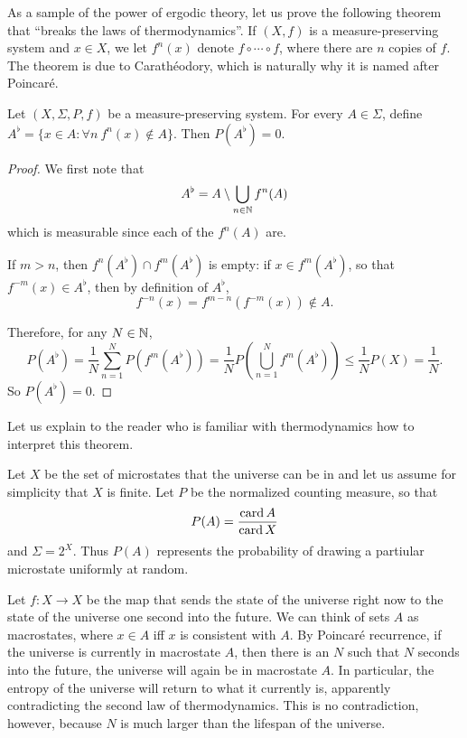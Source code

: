 \begin{subsec}
As a sample of the power of ergodic theory, let us prove the following theorem that ``breaks the laws of thermodynamics''.
If $(X, f)$ is a measure-preserving system and $x \in X$, we let $f^{n}(x)$ denote $f \circ \cdots \circ f$, where there are $n$ copies of $f$.
The theorem is due to Carathéodory, which is naturally why it is named after Poincar\'e.
\end{subsec}

\begin{theorem}
Let $(X, \Sigma, P, f)$ be a measure-preserving system.
For every $A \in \Sigma$, define $A^{\flat} = \{x \in A: \forall n~f^{n}(x) \notin A\}$.
Then $P(A^{\flat}) = 0$.
\end{theorem}
\begin{proof}
We first note that
\[A^{\flat} = A \setminus \bigcup_{n \in \mathbb{N}} f^{n}(A)\]
which is measurable since each of the $f^{n}(A)$ are.

If $m > n$, then $f^{n}(A^{\flat}) \cap f^{m}(A^{\flat})$ is empty: if $x \in f^{m}(A^{\flat})$, so that $f^{-m}(x) \in A^{\flat}$, then by definition of $A^{\flat}$,
\[f^{-n}(x) = f^{m-n}(f^{-m}(x)) \notin A.\]

Therefore, for any $N \in \mathbb{N}$,
\[P(A^{\flat}) = \frac{1}{N} \sum_{n=1}^{N} P(f^{m}(A^{\flat})) = \frac{1}{N} P\left(\bigcup_{n=1}^{N} f^{m}(A^{\flat})\right) \leq \frac{1}{N} P(X) = \frac{1}{N}.\]
So $P(A^{\flat}) = 0$.
\end{proof}

\begin{subsec}
Let us explain to the reader who is familiar with thermodynamics how to interpret this theorem.

Let $X$ be the set of microstates that the universe can be in and let us assume for simplicity that $X$ is finite.
Let $P$ be the normalized counting measure, so that
\[P(A) = \frac{\operatorname{card} A}{\operatorname{card} X}\]
and $\Sigma = 2^{X}$.
Thus $P(A)$ represents the probability of drawing a partiular microstate uniformly at random.

Let $f: X \to X$ be the map that sends the state of the universe right now to the state of the universe one second into the future.
We can think of sets $A$ as macrostates, where $x \in A$ iff $x$ is consistent with $A$.
By Poincar\'e recurrence, if the universe is currently in macrostate $A$, then there is an $N$ such that $N$ seconds into the future, the universe will again be in macrostate $A$.
In particular, the entropy of the universe will return to what it currently is, apparently contradicting the second law of thermodynamics.
This is no contradiction, however, because $N$ is much larger than the lifespan of the universe.
\end{subsec}

